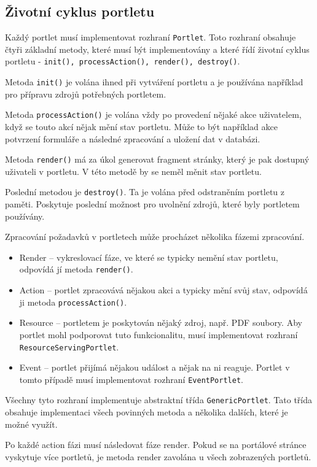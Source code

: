 \documentclass{fithesis}
\begin{document}
\subsection{Životní cyklus portletu}
Každý portlet musí implementovat rozhraní \verb|Portlet|. Toto rozhraní obsahuje čtyři základní metody, které musí být implementovány a které řídí životní cyklus portletu - \verb|init(), processAction(), render(), destroy()|.

Metoda \verb|init()| je volána ihned při vytváření portletu a je používána například pro přípravu zdrojů potřebných portletem.

Metoda \verb|processAction()| je volána vždy po provedení nějaké akce uživatelem, když se touto akcí nějak mění stav portletu. Může to být například akce potvrzení formuláře a následné zpracování a uložení dat v databázi.

Metoda \verb|render()| má za úkol generovat fragment stránky, který je pak dostupný uživateli v portletu. V této metodě by se neměl měnit stav portletu.

Poslední metodou je \verb|destroy()|. Ta je volána před odstraněním portletu z paměti. Poskytuje poslední možnost pro uvolnění zdrojů, které byly portletem používány. \cite{jsr-286}

Zpracování požadavků v portletech může procházet několika fázemi zpracování.

\begin{itemize}
\item Render -- vykreslovací fáze, ve které se typicky nemění stav portletu, odpovídá jí metoda \verb|render()|.
\item Action -- portlet zpracovává nějakou akci a typicky mění svůj stav, odpovídá ji metoda \verb|processAction()|.
\item Resource -- portletem je poskytován nějaký zdroj, např. PDF soubory. Aby portlet mohl podporovat tuto funkcionalitu, musí implementovat rozhraní \verb|ResourceServingPortlet|.
\item Event -- portlet přijímá nějakou událost a nějak na ni reaguje. Portlet v tomto případě musí implementovat rozhraní \verb|EventPortlet|.
\end{itemize}

Všechny tyto rozhraní implementuje abstraktní třída \verb|GenericPortlet|. Tato třída obsahuje implementaci všech povinných metoda a několika dalších, které je možné využít.

Po každé action fázi musí následovat fáze render. Pokud se na portálové stránce vyskytuje více portletů, je metoda render zavolána u všech zobrazených portletů. 
\end{document}
